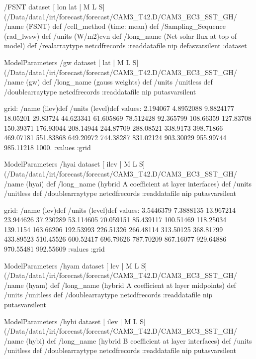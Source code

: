 \begin{ingrid}
 /FSNT{
dataset
[ lon lat | M L S] (/Data/data1/iri/forecast/forecast/CAM3_T42.D/CAM3_EC3_SST_GH/%
/name (FSNT) def
 /cell_method (time: mean) def
 /Sampling_Sequence (rad_lwsw) def
 /units (W/m2)cvn def
 /long_name (Net solar flux at top of model) def
 /realarraytype netcdfrecords :readdatafile
nip
}defasvarsilent
:dataset

ModelParameters /gw{
dataset
[ lat | M L S] (/Data/data1/iri/forecast/forecast/CAM3_T42.D/CAM3_EC3_SST_GH/%
/name (gw) def
 /long_name (gauss weights) def
 /units /unitless def
 /doublearraytype netcdfrecords :readdatafile
nip
}putasvarsilent

grid:
/name (ilev)def
/units (level)def
values: 2.194067 4.8952088 9.8824177 18.05201 29.83724 44.623341 61.605869 78.512428 92.365799 108.66359 127.83708 150.39371 176.93044 208.14944 244.87709 288.08521 338.9173 398.71866 469.07181 551.83868 649.20972 744.38287 831.02124 903.30029 955.99744 985.11218 1000. :values
:grid

ModelParameters  /hyai{
dataset
[ ilev | M L S] (/Data/data1/iri/forecast/forecast/CAM3_T42.D/CAM3_EC3_SST_GH/%
/name (hyai) def
 /long_name (hybrid A coefficient at layer interfaces) def
 /units /unitless def
 /doublearraytype netcdfrecords :readdatafile
nip
}putasvarsilent


grid:
/name (lev)def
/units (level)def
values: 3.5446379 7.3888135 13.967214 23.944626 37.230289 53.114605 70.059151 85.439117 100.51469 118.25034 139.1154 163.66206 192.53993 226.51326 266.48114 313.50125 368.81799 433.89523 510.45526 600.52417 696.79626 787.70209 867.16077 929.64886 970.55481 992.55609 :values
:grid

ModelParameters /hyam{
dataset
[ lev | M L S] (/Data/data1/iri/forecast/forecast/CAM3_T42.D/CAM3_EC3_SST_GH/%
/name (hyam) def
 /long_name (hybrid A coefficient at layer midpoints) def
 /units /unitless def
 /doublearraytype netcdfrecords :readdatafile
nip
}putasvarsilent

ModelParameters /hybi{
dataset
[ ilev | M L S] (/Data/data1/iri/forecast/forecast/CAM3_T42.D/CAM3_EC3_SST_GH/%
/name (hybi) def
 /long_name (hybrid B coefficient at layer interfaces) def
 /units /unitless def
 /doublearraytype netcdfrecords :readdatafile
nip
}putasvarsilent


\end{ingrid}
